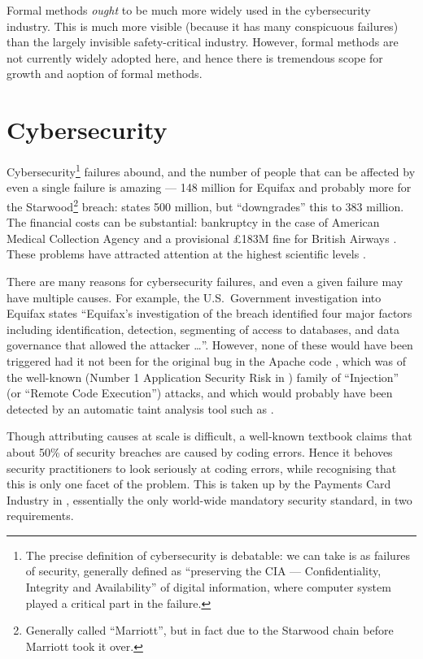 \documentclass{llncs}
\begin{document}
Formal methods \emph{ought} to be much more widely used in the cybersecurity industry.  This is much more visible (because it has many conspicuous failures) than the largely invisible safety-critical industry. However, formal methods are not currently widely adopted here, and hence there is tremendous scope for growth and aoption of formal methods.

\section{Cybersecurity}
Cybersecurity\footnote{The precise definition of cybersecurity is debatable: we can take is as failures of security, generally defined as ``preserving the CIA --- Confidentiality, Integrity and Availability'' of digital information, where computer system played a critical part in the failure.} failures abound, and the number of people that can be affected by even a single failure is amazing --- 148 million for Equifax \cite{Bloomberg2018b} and probably more for the Starwood\footnote{Generally called ``Marriott'', but in fact due to the Starwood chain before Marriott took it over.} breach: \cite{BBC2018o} states 500 million, but \cite{Irwin2019b} ``downgrades'' this to 383 million.  The financial costs can be substantial: bankruptcy in the case of American Medical Collection Agency \cite{Ford2019b} and a provisional \pounds183M fine for British Airways \cite{Guardian2019i}.  These problems have attracted attention at the highest scientific levels \cite{RoyalSociety2016a}.
\par
There are many reasons for cybersecurity failures, and even a given failure may have multiple causes. For example, the U.S.~Government investigation \cite{GAO2018a} into Equifax states ``Equifax's investigation of the breach identified four major factors
including identification, detection, segmenting of access to databases, and data
governance that allowed the attacker \dots''.  However, none of these would have been triggered had it not been for the original bug in the Apache code \cite{Lenart2017a}, which was of the well-known (Number 1 Application Security Risk in \cite{OWASP2017a})  family of ``Injection'' (or ``Remote Code Execution'') attacks, and which would probably have been detected by an automatic taint analysis tool such as \cite{LivshitsLam2005}.
\par
Though attributing causes at scale is difficult, a well-known textbook \cite{McGraw2006} claims that about 50\% of security breaches are caused by coding errors. Hence it behoves security practitioners to look seriously at coding errors, while recognising that this is only one facet of the problem. This is taken up by the Payments Card Industry in \cite{PCI2018b}, essentially the only world-wide mandatory security standard, in two requirements.
\end{document}

